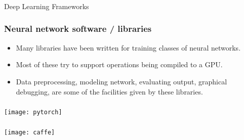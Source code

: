 \begin{frame}[fragile]\frametitle{}
\begin{center}
{\Large Deep Learning Frameworks}
\end{center}
\end{frame}





\begin{frame}[fragile] \frametitle{Neural network software / libraries}
\begin{itemize}
\item Many libraries have been written for training
classes of neural networks. 
\item Most of these try to support operations being compiled to a GPU.
\item Data preprocessing, modeling network, evaluating output, graphical debugging, are some of the facilities given by these libraries.
\end{itemize}
\end{frame}

\begin{frame}[fragile] \frametitle{}

\texttt{[image: pytorch]}

\end{frame}

\begin{frame}[fragile] \frametitle{}

\texttt{[image: caffe]}

\end{frame}

